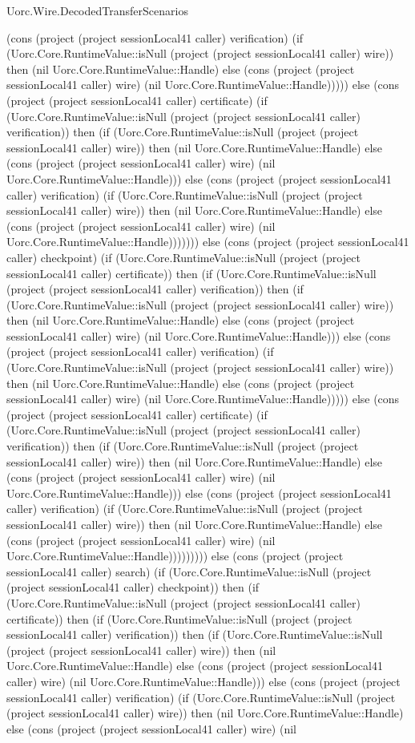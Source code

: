 \begin{lexlean}{Uorc.Wire.DecodedTransferScenarios}
\begin{semanticmodule}
{(cons (project (project sessionLocal41 caller) verification) (if (Uorc.Core.RuntimeValue::isNull (project (project sessionLocal41 caller) wire)) then (nil Uorc.Core.RuntimeValue::Handle) else (cons (project (project sessionLocal41 caller) wire) (nil Uorc.Core.RuntimeValue::Handle))))) else (cons (project (project sessionLocal41 caller) certificate) (if (Uorc.Core.RuntimeValue::isNull (project (project sessionLocal41 caller) verification)) then (if (Uorc.Core.RuntimeValue::isNull (project (project sessionLocal41 caller) wire)) then (nil Uorc.Core.RuntimeValue::Handle) else (cons (project (project sessionLocal41 caller) wire) (nil Uorc.Core.RuntimeValue::Handle))) else (cons (project (project sessionLocal41 caller) verification) (if (Uorc.Core.RuntimeValue::isNull (project (project sessionLocal41 caller) wire)) then (nil Uorc.Core.RuntimeValue::Handle) else (cons (project (project sessionLocal41 caller) wire) (nil Uorc.Core.RuntimeValue::Handle))))))) else (cons (project (project sessionLocal41 caller) checkpoint) (if (Uorc.Core.RuntimeValue::isNull (project (project sessionLocal41 caller) certificate)) then (if (Uorc.Core.RuntimeValue::isNull (project (project sessionLocal41 caller) verification)) then (if (Uorc.Core.RuntimeValue::isNull (project (project sessionLocal41 caller) wire)) then (nil Uorc.Core.RuntimeValue::Handle) else (cons (project (project sessionLocal41 caller) wire) (nil Uorc.Core.RuntimeValue::Handle))) else (cons (project (project sessionLocal41 caller) verification) (if (Uorc.Core.RuntimeValue::isNull (project (project sessionLocal41 caller) wire)) then (nil Uorc.Core.RuntimeValue::Handle) else (cons (project (project sessionLocal41 caller) wire) (nil Uorc.Core.RuntimeValue::Handle))))) else (cons (project (project sessionLocal41 caller) certificate) (if (Uorc.Core.RuntimeValue::isNull (project (project sessionLocal41 caller) verification)) then (if (Uorc.Core.RuntimeValue::isNull (project (project sessionLocal41 caller) wire)) then (nil Uorc.Core.RuntimeValue::Handle) else (cons (project (project sessionLocal41 caller) wire) (nil Uorc.Core.RuntimeValue::Handle))) else (cons (project (project sessionLocal41 caller) verification) (if (Uorc.Core.RuntimeValue::isNull (project (project sessionLocal41 caller) wire)) then (nil Uorc.Core.RuntimeValue::Handle) else (cons (project (project sessionLocal41 caller) wire) (nil Uorc.Core.RuntimeValue::Handle))))))))) else (cons (project (project sessionLocal41 caller) search) (if (Uorc.Core.RuntimeValue::isNull (project (project sessionLocal41 caller) checkpoint)) then (if (Uorc.Core.RuntimeValue::isNull (project (project sessionLocal41 caller) certificate)) then (if (Uorc.Core.RuntimeValue::isNull (project (project sessionLocal41 caller) verification)) then (if (Uorc.Core.RuntimeValue::isNull (project (project sessionLocal41 caller) wire)) then (nil Uorc.Core.RuntimeValue::Handle) else (cons (project (project sessionLocal41 caller) wire) (nil Uorc.Core.RuntimeValue::Handle))) else (cons (project (project sessionLocal41 caller) verification) (if (Uorc.Core.RuntimeValue::isNull (project (project sessionLocal41 caller) wire)) then (nil Uorc.Core.RuntimeValue::Handle) else (cons (project (project sessionLocal41 caller) wire) (nil }
\end{semanticmodule}
\end{lexlean}
